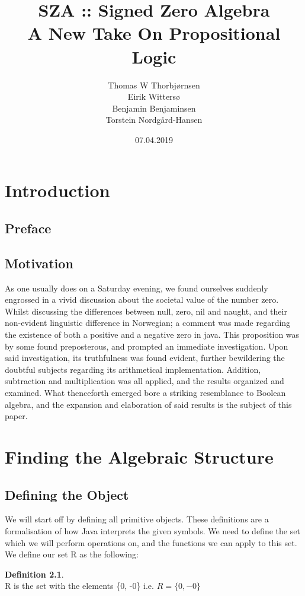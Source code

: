 \documentclass[12pt]{report}
\title{\Huge SZA :: Signed Zero Algebra \\
       \Large A New Take On Propositional Logic}
\author{{Thomas W Thorbjørnsen} \\
        {Eirik Wittersø}\\
        {Benjamin Benjaminsen}\\
        {Torstein Nordgård-Hansen}}
\date{07.04.2019}
\theoremstyle{definition}
\newtheorem{definition}{Definition}[section]
\theoremstyle{remark}
\begin{document}
\maketitle
\large
\tableofcontents
\newpage

\normalsize
\chapter{Introduction}
  \section{Preface}
  \section{Motivation}
    As one usually does on a Saturday evening,
    we found ourselves suddenly engrossed in a vivid discussion
    about the societal value of the number zero.
    Whilst discussing the differences between null, zero, nil and naught,
    and their non-evident linguistic difference in Norwegian;
    a comment was made regarding the existence of both a positive and a negative zero in java.
    This proposition was by some found preposterous, and prompted an immediate investigation.
    Upon said investigation, its truthfulness was found evident, further bewildering the doubtful subjects
    regarding its arithmetical implementation.
    Addition, subtraction and multiplication was all applied, and the results organized and examined.
    What thenceforth emerged bore a striking resemblance to Boolean algebra,
    and the expansion and elaboration of said results is the subject of this paper.

\chapter{Finding the Algebraic Structure}
  \section{Defining the Object}
    We will start off by defining all primitive objects. These definitions are a
    formalisation of how Java interprets the given symbols. We need to define the set
    which we will perform operations on, and the functions we can apply to this set.
    We define our set R as the following: \\

    \begin{definition}$\ $\\
    R is the set with the elements \{0, -0\} i.e. $R=\{0,-0\}$
    \end{definition}
\end{document}
